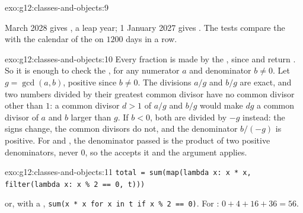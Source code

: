 \begin{solution}{exo:g12:classes-and-objects:9}
\smallskip\noindent\hspace*{2em}

\noindent\hspace*{4em}

\noindent\hspace*{4em}

\noindent\hspace*{6em}

\noindent\hspace*{4em}

\noindent\hspace*{6em}

\noindent\hspace*{4em}

\smallskip{} March 2028 gives , a leap year; 1 January 2027 gives . The
tests compare the  with the calendar of the  on $1200$ days in a row.
\end{solution}

\begin{solution}{exo:g12:classes-and-objects:10}
Every fraction is made by the , since \code{+} and \code{*} return . So it is enough
to check the , for any numerator $a$ and denominator $b \ne 0$. Let $g = \gcd(a, b)$, positive since
$b \ne 0$. The divisions $a / g$ and $b / g$ are exact, and two numbers divided by their greatest common divisor have
no common divisor other than $1$: a common divisor $d > 1$ of $a/g$ and $b/g$ would make $dg$ a common divisor of
$a$ and $b$ larger than $g$. If $b < 0$, both are divided by $-g$ instead: the signs change, the common divisors do
not, and the denominator $b / (-g)$ is positive. For \code{+} and \code{*}, the denominator passed is the product of
two positive denominators, never $0$, so the  accepts it and the argument applies.
\end{solution}

\begin{solution}{exo:g12:classes-and-objects:11}
\smallskip\noindent\hspace*{2em}\texttt{total = sum(map(lambda x: x * x, filter(lambda x: x \% 2 == 0, t)))}

\smallskip\noindent or, with a , \texttt{sum(x * x for x in t if x \% 2 == 0)}. For
: $0 + 4 + 16 + 36 = 56$.
\end{solution}


